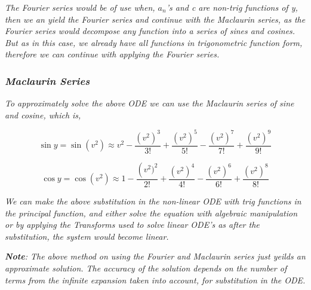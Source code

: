 		\textit{The Fourier series would be of use when, $a_n$'s and c are non-trig functions of y, then we an yield the Fourier series and continue with the Maclaurin series, as the Fourier series would decompose any function into a series of sines and cosines. But as in this case, we already have all functions in trigonometric function form, therefore we can continue with applying the Fourier series.}	
	
	\subsubsection{\textit{Maclaurin Series}}

		\textit{To approximately solve the above ODE we can use the Maclaurin series of sine and cosine, which is,}

			$$\sin y = \sin\left(v^2\right) \approx v^2 - \frac{\left(v^2\right)^3}{3!} + \frac{\left(v^2\right)^5}{5!} - \frac{\left(v^2\right)^7}{7!} + \frac{\left(v^2\right)^9}{9!}$$

		$$\cos y = \cos\left(v^2\right) \approx 1 - \frac{\left(v^2)^2}{2!} + \frac{\left(v^2\right)^4}{4!} - \frac{\left(v^2\right)^6}{6!} + \frac{\left(v^2\right)^8}{8!}$$

		\textit{We can make the above substitution in the non-linear ODE with trig functions in the principal function, and either solve the equation with algebraic manipulation or by applying the Transforms used to solve linear ODE's as after the substitution, the system would become linear.}

		\textit{\textbf{Note}: The above method on using the Fourier and Maclaurin series just yeilds an approximate solution. The accuracy of the solution depends on the number of terms from the infinite expansion taken into account, for substitution in the ODE.}


